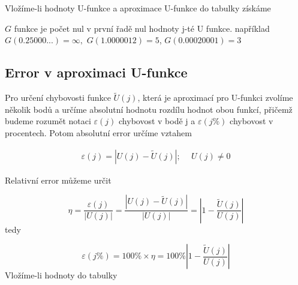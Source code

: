Vložíme-li hodnoty U-funkce a 
aproximace U-funkce do tabulky získáme

\newpage

\begin{definition}[G-funkce]
      \(G\) funkce je počet nul v první řadě nul hodnoty
      j-té U funkce. například \(G(0.25000...) = \infty,\)
      \(G(1.0000012) = 5\), \(G(0.00020001) = 3\)
\end{definition}

\subsection{Error v aproximaci U-funkce}

Pro určení chybovosti funkce \(\tilde{U}(j)\), která 
je aproximací pro U-funkci zvolíme několik bodů a určíme
absolutní hodnotu rozdílu hodnot obou funkcí, přičemž budeme
rozumět notaci \(\varepsilon(j)\) chybovost v bodě j a 
\(\varepsilon(j\%)\) chybovost v procentech. Potom absolutní
error určíme vztahem

\begin{align}
      \varepsilon(j) = | U(j) - \tilde{U}(j) 
      |; \  & \  U(j) \neq 0 
\end{align}

Relativní error můžeme určit

\[\eta = \frac{\varepsilon(j) }{|U(j)|} = \frac{ | U(j) -
\tilde{U}(j) |}{|U(j)|} = \left| 1 - 
\frac{\tilde{U}(j)}{U(j)}\right|\]
tedy

\[\varepsilon(j\%) = 100 \% \times 
\eta = 100\% \left| 1 - \frac{\tilde{U}(j)}{U(j)}\right|\]
Vložíme-li hodnoty do tabulky


